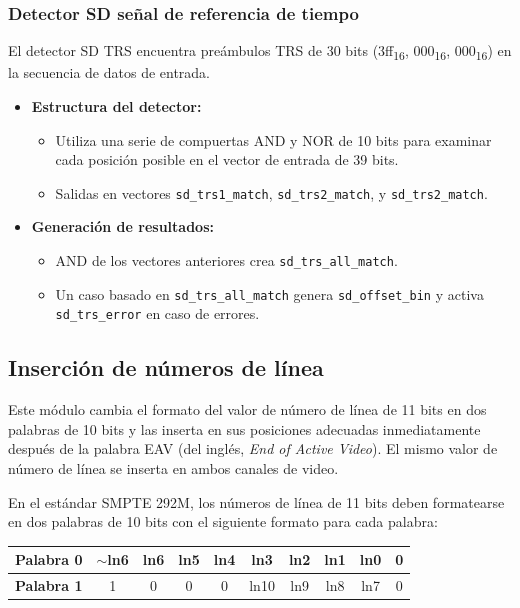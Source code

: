 \subsubsection{Detector SD señal de referencia de tiempo}

El detector SD TRS encuentra preámbulos TRS de 30 bits (3ff\textsubscript{16},
000\textsubscript{16}, 000\textsubscript{16}) en
la secuencia de datos de entrada.

\begin{itemize}
    \item \textbf{Estructura del detector:}
    \begin{itemize}
        \item Utiliza una serie de compuertas AND y NOR de 10 bits para examinar cada posición posible en el vector de entrada de 39 bits.
        \item Salidas en vectores \texttt{sd\_trs1\_match}, \texttt{sd\_trs2\_match}, y \texttt{sd\_trs2\_match}.
    \end{itemize}
    
    \item \textbf{Generación de resultados:}
    \begin{itemize}
        \item AND de los vectores anteriores crea \texttt{sd\_trs\_all\_match}.
        \item Un caso basado en \texttt{sd\_trs\_all\_match} genera \texttt{sd\_offset\_bin} y activa \texttt{sd\_trs\_error} en caso de errores.
    \end{itemize}
\end{itemize}

\subsection{Inserción de números de línea}

Este módulo cambia el formato del valor de número de línea de 11 bits en dos
palabras de 10 bits y las inserta en sus posiciones adecuadas inmediatamente
después de la palabra EAV (del inglés, \textit{End of Active Video})\@. El mismo valor
de número de línea se inserta en ambos canales de video.

En el estándar SMPTE 292M, los números de línea de 11 bits deben formatearse en
dos palabras de 10 bits con el siguiente formato para cada palabra:

\begin{center}
  \begin{tabular}{|c|c|c|c|c|c|c|c|c|c|}
    \hline
    \textbf{Palabra 0} & $\sim$ln6 & ln6 & ln5 & ln4 & ln3 & ln2 & ln1 & ln0 & 0 \\
    \hline
    \textbf{Palabra 1} & 1 & 0 & 0 & 0 & ln10 & ln9 & ln8 & ln7 & 0 \\
    \hline
  \end{tabular}
\end{center}

